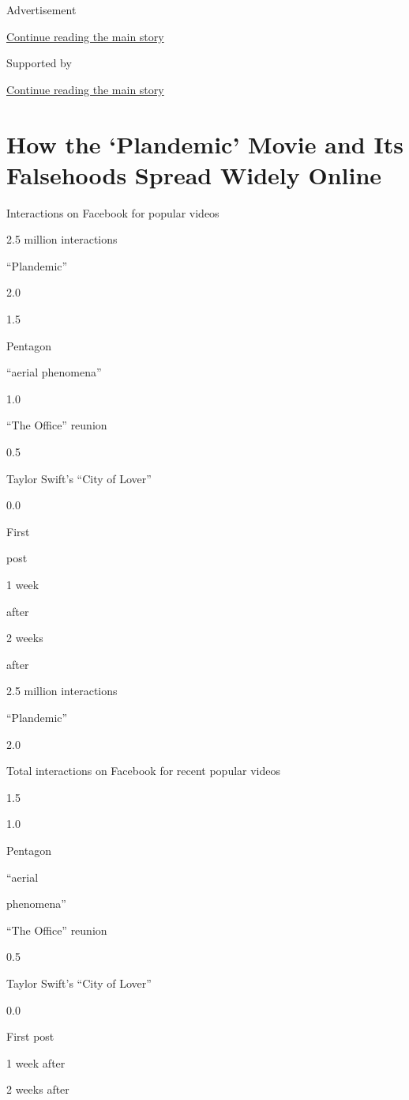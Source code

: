Advertisement

\protect\hyperlink{after-top}{Continue reading the main story}

Supported by

\protect\hyperlink{after-sponsor}{Continue reading the main story}

\hypertarget{how-the-plandemic-movie-and-its-falsehoods-spread-widely-online}{%
\section{How the `Plandemic' Movie and Its Falsehoods Spread Widely
Online}\label{how-the-plandemic-movie-and-its-falsehoods-spread-widely-online}}

Interactions on Facebook for popular videos

2.5 million interactions

``Plandemic''

2.0

1.5

Pentagon

``aerial phenomena''

1.0

``The Office'' reunion

0.5

Taylor Swift's ``City of Lover''

0.0

First

post

1 week

after

2 weeks

after

2.5 million interactions

``Plandemic''

2.0

Total interactions on Facebook for recent popular videos

1.5

1.0

Pentagon

``aerial

phenomena''

``The Office'' reunion

0.5

Taylor Swift's ``City of Lover''

0.0

First post

1 week after

2 weeks after

